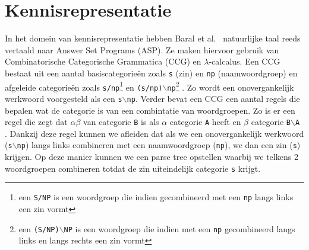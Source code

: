 


\section{Kennisrepresentatie}
\label{sec:ASP}
In het domein van kennisrepresentatie hebben Baral et al.\ \cite{Baral2008} natuurlijke taal reeds vertaald naar Answer Set Programs (ASP). Ze maken hiervoor gebruik van Combinatorische Categorische Grammatica (CCG) en $\lambda$-calcalus. Een CCG bestaat uit een aantal basiscategorie\"en zoals \texttt{s} (zin) en \texttt{np} (naamwoordgroep) en afgeleide categorie\"en zoals \texttt{s/np}\footnote{een \texttt{S/NP} is een woordgroep die indien gecombineerd met een \texttt{np} langs links een zin vormt} en \texttt{(s/np)$\backslash$np}\footnote{een \texttt{(S/NP)$\backslash$NP} is een woordgroep die indien met een \texttt{np} gecombineerd langs links en langs rechts een zin vormt} \cite{Baral2008}. Zo wordt een onovergankelijk werkwoord voorgesteld als een \texttt{s$\backslash$np}. Verder bevat een CCG een aantal regels die bepalen wat de categorie is van een combintatie van woordgroepen. Zo is er een regel die zegt dat $\alpha\beta$ van categorie \texttt{B} is als $\alpha$ categorie \texttt{A} heeft en $\beta$ categorie \texttt{B$\backslash$A} \cite{Baral2008}. Dankzij deze regel kunnen we afleiden dat als we een onovergankelijk werkwoord (\texttt{s$\backslash$np}) langs links combineren met een naamwoordgroep (\texttt{np}), we dan een zin (\texttt{s}) krijgen. Op deze manier kunnen we een parse tree opstellen waarbij we telkens 2 woordgroepen combineren totdat de zin uiteindelijk categorie \texttt{s} krijgt.


